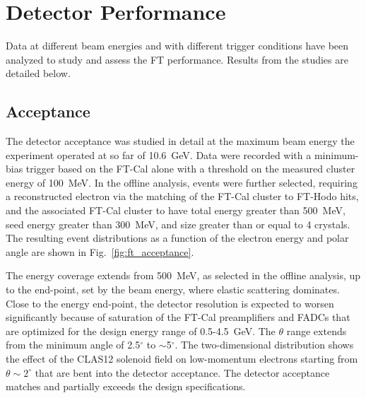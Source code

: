 \section{Detector Performance}
\label{sec:performance}

Data at different beam energies and with different trigger conditions have been analyzed to study and assess the
FT performance. Results from the studies are detailed below.

\subsection{Acceptance}

The detector acceptance was studied in detail at the maximum beam energy the experiment operated at so far of
10.6~GeV. Data were recorded with a minimum-bias trigger based on the FT-Cal alone with a threshold on the
measured cluster energy of 100~MeV. In the offline analysis, events were further selected, requiring a reconstructed
electron via the matching of the FT-Cal cluster to FT-Hodo hits, and the associated FT-Cal cluster to have total energy
greater than 500~MeV, seed energy greater than 300~MeV, and size greater than or equal to 4 crystals. The resulting
event distributions as a function of the electron energy and polar angle are shown in Fig.~\ref{fig:ft_acceptance}. 

The energy coverage extends from 500~MeV, as selected in the offline analysis, up to the end-point, set by the
beam energy, where elastic scattering dominates. Close to the energy end-point, the detector resolution is expected
to worsen significantly because of saturation of the FT-Cal preamplifiers and FADCs that are optimized for the
design energy range of 0.5-4.5~GeV. The $\theta$ range extends from the minimum angle of 2.5$^\circ$ to
$\sim$5$^\circ$. The two-dimensional distribution shows the effect of the CLAS12 solenoid field on low-momentum
electrons starting from $\theta\sim2^\circ$ that are bent into the detector acceptance. The detector
acceptance matches and partially exceeds the design specifications. 

